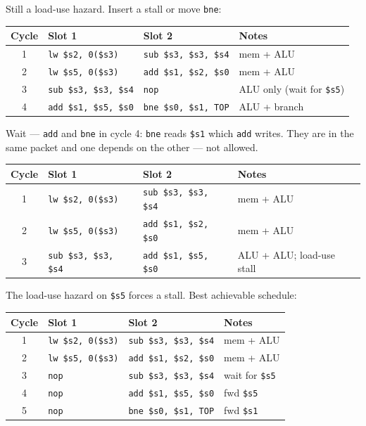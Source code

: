 \noindent Still a load-use hazard.  Insert a stall or move \texttt{bne}:

\begin{center}
\begin{tabular}{clll}
\toprule
\textbf{Cycle} & \textbf{Slot 1} & \textbf{Slot 2} & \textbf{Notes} \\
\midrule
1 & \texttt{lw \$s2, 0(\$s3)} & \texttt{sub \$s3, \$s3, \$s4} & mem + ALU \\
2 & \texttt{lw \$s5, 0(\$s3)} & \texttt{add \$s1, \$s2, \$s0} & mem + ALU \\
3 & \texttt{sub \$s3, \$s3, \$s4} & \texttt{nop} & ALU only (wait for \texttt{\$s5}) \\
4 & \texttt{add \$s1, \$s5, \$s0} & \texttt{bne \$s0, \$s1, TOP} & ALU + branch \\
\bottomrule
\end{tabular}
\end{center}

\noindent Wait --- \texttt{add} and \texttt{bne} in cycle 4: \texttt{bne}
reads \texttt{\$s1} which \texttt{add} writes.  They are in the same packet
and one depends on the other --- not allowed.

\begin{center}
\begin{tabular}{clll}
\toprule
\textbf{Cycle} & \textbf{Slot 1} & \textbf{Slot 2} & \textbf{Notes} \\
\midrule
1 & \texttt{lw \$s2, 0(\$s3)} & \texttt{sub \$s3, \$s3, \$s4} & mem + ALU \\
2 & \texttt{lw \$s5, 0(\$s3)} & \texttt{add \$s1, \$s2, \$s0} & mem + ALU \\
3 & \texttt{sub \$s3, \$s3, \$s4} & \texttt{add \$s1, \$s5, \$s0} & ALU + ALU; load-use stall \\
\bottomrule
\end{tabular}
\end{center}

\noindent The load-use hazard on \texttt{\$s5} forces a stall.  Best
achievable schedule:

\begin{center}
\begin{tabular}{clll}
\toprule
\textbf{Cycle} & \textbf{Slot 1} & \textbf{Slot 2} & \textbf{Notes} \\
\midrule
1 & \texttt{lw \$s2, 0(\$s3)} & \texttt{sub \$s3, \$s3, \$s4} & mem + ALU \\
2 & \texttt{lw \$s5, 0(\$s3)} & \texttt{add \$s1, \$s2, \$s0} & mem + ALU \\
3 & \texttt{nop} & \texttt{sub \$s3, \$s3, \$s4} & wait for \texttt{\$s5} \\
4 & \texttt{nop} & \texttt{add \$s1, \$s5, \$s0} & fwd \texttt{\$s5} \\
5 & \texttt{nop} & \texttt{bne \$s0, \$s1, TOP} & fwd \texttt{\$s1} \\
\bottomrule
\end{tabular}
\end{center}

